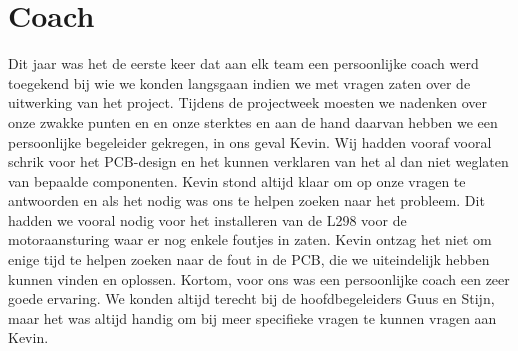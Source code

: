 \chapter{Coach}
Dit jaar was het de eerste keer dat aan elk team een persoonlijke coach werd toegekend bij wie we konden langsgaan indien we met vragen zaten over de uitwerking van het project. Tijdens de projectweek moesten we nadenken over onze zwakke punten en en onze sterktes en aan de hand daarvan hebben we een persoonlijke begeleider gekregen, in ons geval Kevin. Wij hadden vooraf vooral schrik voor het PCB-design en het kunnen verklaren van het al dan niet weglaten van bepaalde componenten. Kevin stond altijd klaar om op onze vragen te antwoorden en als het nodig was ons te helpen zoeken naar het probleem. Dit hadden we vooral nodig voor het installeren van de L298 voor de motoraansturing waar er nog enkele foutjes in zaten. Kevin ontzag het niet om enige tijd te helpen zoeken naar de fout in de PCB, die we uiteindelijk hebben kunnen vinden en oplossen. Kortom, voor ons was een persoonlijke coach een zeer goede ervaring. We konden altijd terecht bij de hoofdbegeleiders Guus en Stijn, maar het was altijd handig om bij meer specifieke vragen te kunnen vragen aan Kevin.